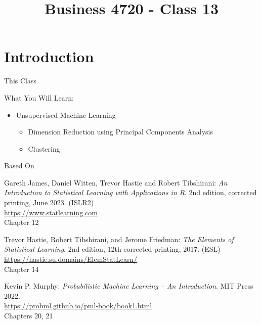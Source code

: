 \documentclass[ignorenonframetext,xcolor=x11names]{beamer}
\title{Business 4720 - Class 13}
\begin{document}
\begin{frame}[label=full]{}
  \titlepage
  \footnotesize
  
\end{frame}

\section{Introduction}

\begin{frame}[label=full]{This Class}

\begin{block}{What You Will Learn:}
\begin{itemize}
  \item Unsupervised Machine Learning
  \begin{itemize}
     \item Dimension Reduction using Principal Components Analysis
     \item Clustering
  \end{itemize}
\end{itemize}
\end{block}
\end{frame}

\begin{frame}[label=full]{Based On}
\small
\begin{block}{}
Gareth James, Daniel Witten, Trevor Hastie and Robert Tibshirani: \emph{An Introduction to Statistical Learning with Applications in R}. 2nd edition, corrected printing, June 2023. (ISLR2) \\
\vspace{1mm}
\url{https://www.statlearning.com} \\
\vspace{1mm}
Chapter 12
\end{block}

\begin{block}{}
Trevor Hastie, Robert Tibshirani, and Jerome Friedman: \emph{The Elements of Statistical Learning}. 2nd edition, 12th corrected printing, 2017. (ESL) \\
\vspace{1mm}
\url{https://hastie.su.domains/ElemStatLearn/} \\
\vspace{1mm}
Chapter 14
\end{block}

\begin{block}{}
Kevin P. Murphy: \emph{Probabilistic Machine Learning -- An Introduction}. MIT Press 2022. \\
\vspace{1mm}
\url{https://probml.github.io/pml-book/book1.html} \\
\vspace{1mm}
Chapters 20, 21
\end{block}
\end{frame}
\end{document}
